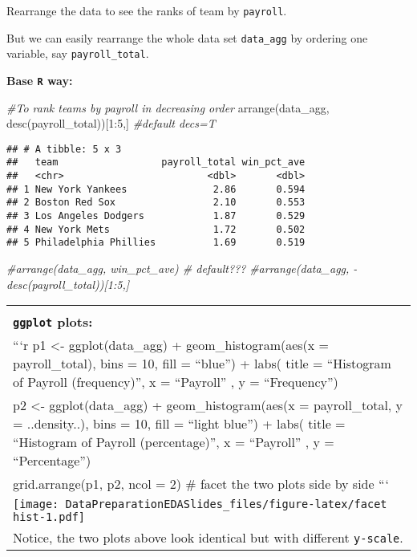 \documentclass[
]{article}
\newenvironment{Shaded}{\begin{snugshade}}{\end{snugshade}}
\newcommand{\CommentTok}[1]{\textcolor[rgb]{0.56,0.35,0.01}{\textit{#1}}}
\newcommand{\DecValTok}[1]{\textcolor[rgb]{0.00,0.00,0.81}{#1}}
\newcommand{\FunctionTok}[1]{\textcolor[rgb]{0.00,0.00,0.00}{#1}}
\newcommand{\NormalTok}[1]{#1}
\newcommand{\SpecialCharTok}[1]{\textcolor[rgb]{0.00,0.00,0.00}{#1}}
\begin{document}
Rearrange the data to see the ranks of team by \texttt{payroll}.

But we can easily rearrange the whole data set \texttt{data\_agg} by
ordering one variable, say \texttt{payroll\_total}.

\textbf{Base \texttt{R} way:} \tiny

\begin{Shaded}
\begin{Highlighting}[]
\CommentTok{\#To rank teams by payroll in decreasing order}
\FunctionTok{arrange}\NormalTok{(data\_agg, }\FunctionTok{desc}\NormalTok{(payroll\_total))[}\DecValTok{1}\SpecialCharTok{:}\DecValTok{5}\NormalTok{,] }\CommentTok{\#default decs=T}
\end{Highlighting}
\end{Shaded}

\begin{verbatim}
## # A tibble: 5 x 3
##   team                  payroll_total win_pct_ave
##   <chr>                         <dbl>       <dbl>
## 1 New York Yankees               2.86       0.594
## 2 Boston Red Sox                 2.10       0.553
## 3 Los Angeles Dodgers            1.87       0.529
## 4 New York Mets                  1.72       0.502
## 5 Philadelphia Phillies          1.69       0.519
\end{verbatim}

\begin{Shaded}
\begin{Highlighting}[]
\CommentTok{\#arrange(data\_agg, win\_pct\_ave) \# default???}
\CommentTok{\#arrange(data\_agg, {-}desc(payroll\_total))[1:5,] }
\end{Highlighting}
\end{Shaded}

\begin{longtable}[]{@{}
  >{\raggedright\arraybackslash}p{}@{}}
\toprule
\endhead
 \\
\textbf{\texttt{ggplot} plots:} \tiny \\
```r p1 \textless- ggplot(data\_agg) + geom\_histogram(aes(x =
payroll\_total), bins = 10, fill = ``blue'') + labs( title = ``Histogram
of Payroll (frequency)'', x = ``Payroll'' , y = ``Frequency'') \\
p2 \textless- ggplot(data\_agg) + geom\_histogram(aes(x =
payroll\_total, y = ..density..), bins = 10, fill = ``light blue'') +
labs( title = ``Histogram of Payroll (percentage)'', x = ``Payroll'' , y
= ``Percentage'') \\
grid.arrange(p1, p2, ncol = 2) \# facet the two plots side by side
``` \\
\texttt{[image: DataPreparationEDASlides\_files/figure-latex/facet hist-1.pdf]} \\
\normalsize Notice, the two plots above look identical but with
different \texttt{y-scale}. \\
\bottomrule
\end{longtable}
\end{document}
